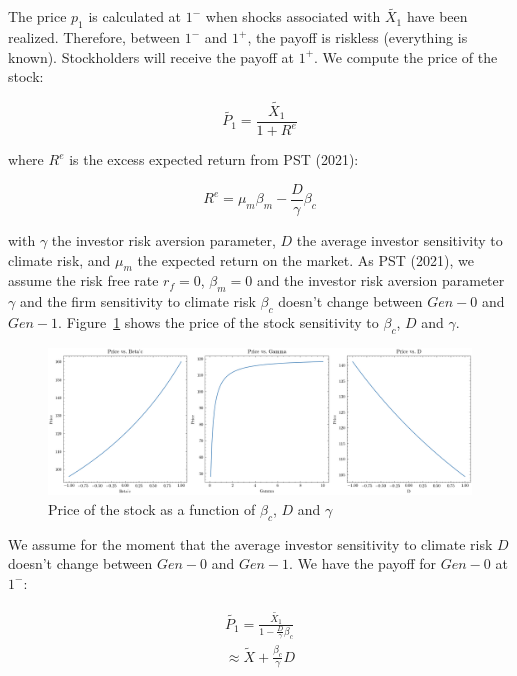 The price $p_1$ is calculated at $1^{-}$ when
shocks associated with $\tilde{X_1}$ 
have been realized. Therefore, 
between $1^{-}$ and $1^{+}$, the payoff is
riskless (everything is known).
Stockholders will 
receive the payoff at $1^{+}$.
We compute the price of the stock:

\begin{equation}
    \tilde{P_1} = \frac{\tilde{X_1}}{1 + R^e}
\end{equation}

where $R^e$ is the excess expected return 
from PST (2021):

\begin{equation}
    R^e = \mu_m \beta_m - \frac{D}{\gamma} \beta_{c}
\end{equation}

with $\gamma$ the investor risk aversion parameter,
$D$ the average investor sensitivity to climate risk,
and $\mu_m$ the expected return on the market.
As PST (2021), we assume the 
risk free rate $r_f = 0$, $\beta_m = 0$ and the investor 
risk aversion parameter $\gamma$ and the 
firm sensitivity to climate risk $\beta_{c}$
doesn't change between $Gen-0$ and $Gen-1$.
Figure~\ref{fig:fig02} shows the price of the stock 
sensitivity to $\beta_{c}$, $D$ and $\gamma$.

\begin{figure}
    \includegraphics[width=\textwidth]{../images/chapter02/price_vs_parameters.png}
    \caption{Price of the stock as a function of $\beta_{c}$, $D$
    and $\gamma$}
    \label{fig:fig02}
\end{figure}

We assume for the moment that the average 
investor sensitivity to climate risk $D$ 
doesn't change between $Gen-0$ and $Gen-1$.
We have the payoff for $Gen-0$ at $1^{-}$:

\begin{equation}
    \begin{aligned}
    \tilde{P_1} = \frac{\tilde{X_1}}{1 - \frac{D}{\gamma} \beta_{c}} \\
    \approx \tilde{X} + \frac{\beta_{c}}{\gamma}D
    \end{aligned}
\end{equation}

